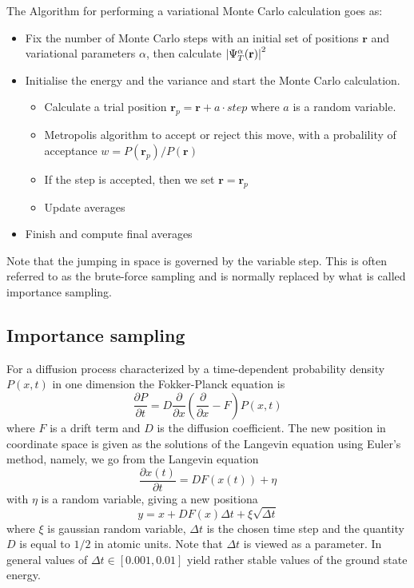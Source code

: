 \documentclass[a4paper, 10pt, english]{revtex4-2} %
\newcommand{\parder}[2]{\frac{\partial #1}{\partial #2}}
\begin{document}
        The Algorithm for performing a variational Monte Carlo calculation goes as:
        \begin{itemize}
            \item Fix the number of Monte Carlo steps with an initial set of positions $\mathbf{r}$ and variational parameters $\alpha$, then calculate $\abs{\Psi_T^\alpha(\mathbf{r})}^2$
            \item Initialise the energy and the variance and start the Monte Carlo calculation.
            \begin{itemize}
                \item Calculate a trial position $\mathbf{r}_p = \mathbf{r} + a \cdot step$ where $a$ is a random variable.
                \item Metropolis algorithm to accept or reject this move, with a probalility of acceptance $w = P(\mathbf{r}_p) / P(\mathbf{r})$
                \item If the step is accepted, then we set $\mathbf{r} = \mathbf{r}_p$
                \item Update averages
            \end{itemize}
            \item Finish and compute final averages
        \end{itemize}
        Note that the jumping in space is governed by the variable step. 
        This is often referred to as the brute-force sampling and is normally replaced by what is called importance sampling.

    \subsection*{Importance sampling}
        For a diffusion process characterized by a time-dependent probability density $P(x, t)$ in one dimension the Fokker-Planck equation is
        \begin{equation}
                \parder{P}{t}
            =   D\parder{}{x}\left(\parder{}{x} - F\right)P(x, t)
        \end{equation}
        where $F$ is a drift term and $D$ is the diffusion coefficient.
        The new position in coordinate space is given as the solutions of the Langevin equation using Euler's method, namely, we go from the Langevin equation
        \begin{equation}
                \parder{x(t)}{t}
            =   DF(x(t)) + \eta
        \end{equation}
        with $\eta$ is a random variable, giving a new positiona
        \begin{equation}
                y
            =   x + DF(x)\Delta t + \xi \sqrt{\Delta t}
        \end{equation}
        where $\xi$ is gaussian random variable, $\Delta t$ is the chosen time step and the quantity $D$ is equal to $1/2$ in atomic units.
        Note that $\Delta t$ is viewed as a parameter. 
        In general values of $\Delta t \in [0.001, 0.01]$ yield rather stable values of the ground state energy.
\end{document}
